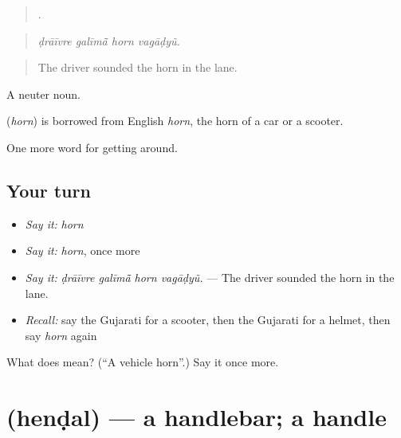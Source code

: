 \begin{quote}
   .
\end{quote}

\begin{quote}
\emph{ḍrāīvre galīmā̃ horn vagāḍyũ.}
\end{quote}

\begin{quote}
The driver sounded the horn in the lane.
\end{quote}

A neuter noun.

\begin{cousinweb}
\textbf{} (\emph{horn}) is borrowed from English \emph{horn}, the horn of a car or a scooter.
\end{cousinweb}

\begin{grammarlens}[title={What you've built}]
One more word for getting around.
\end{grammarlens}

\subsection*{Your turn}
\begin{itemize}
\raggedright
  \item \emph{Say it:} \emph{horn}
  \item \emph{Say it:} \emph{horn}, once more
  \item \emph{Say it:} \emph{ḍrāīvre galīmā̃ horn vagāḍyũ.} — The driver sounded the horn in the lane.
  \item \emph{Recall:} say the Gujarati for a scooter, then the Gujarati for a helmet, then say \emph{horn} again
\end{itemize}

\begin{tcolorbox}[breakable,colback=teal!4,colframe=teal!35!black,title={Before you move on}]
What does  mean? (\textquotedblleft{}A vehicle horn\textquotedblright{}.) Say it once more.
\end{tcolorbox}
\section[\texorpdfstring{\gu{હેન્ડલ} (henḍal)}{હેન્ડલ (henḍal)}]{ (henḍal) — a handlebar; a handle}

\label{lesson:GU-C400-hendal}



